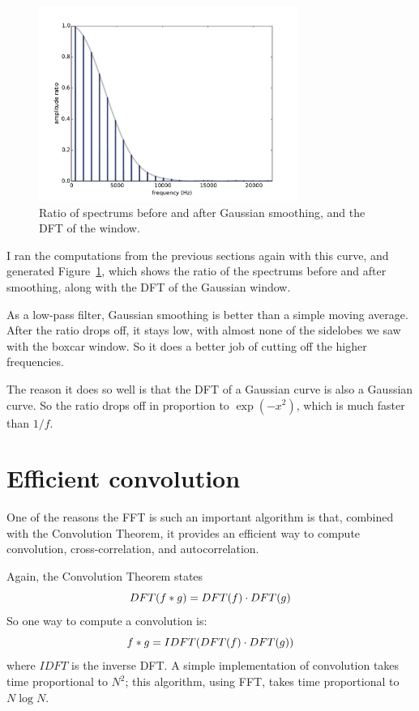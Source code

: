 \documentclass[12pt]{book}
\begin{document}
\begin{figure}
\centerline{\includegraphics[height=2.5in]{figs/convolution8.pdf}}
\caption{Ratio of spectrums before and after Gaussian smoothing, and
  the DFT of the window.}
\label{fig.convolution8}
\end{figure}

I ran the computations from the previous sections again
with this curve, and generated Figure~\ref{fig.convolution8},
which shows the ratio of the spectrums before and after
smoothing, along with the DFT of the Gaussian window. 

As a low-pass filter, Gaussian smoothing is better than a simple
moving average.  After the ratio drops off, it
stays low, with almost none of the sidelobes we saw with the boxcar
window.  So it does a better job of cutting off the higher frequencies.

The reason it does so well is that the DFT of a Gaussian curve is also a
Gaussian curve.  So the ratio drops off in proportion to $\exp(-x^2)$,
which is much faster than $1/f$.


\section{Efficient convolution}
\label{effconv}

One of the reasons the FFT is such an important algorithm is that,
combined with the Convolution Theorem, it provides an efficient
way to compute convolution, cross-correlation, and autocorrelation.

Again, the Convolution Theorem states
%
\[ DFT(f \ast g) = DFT(f) \cdot DFT(g) \]
%
So one way to compute a convolution is:
%
\[ f \ast g = IDFT(DFT(f) \cdot DFT(g)) \]
%
where $IDFT$ is the inverse DFT.  A simple implementation of
convolution takes time proportional to $N^2$; this algorithm,
using FFT, takes time proportional to $N \log N$.
\end{document}
